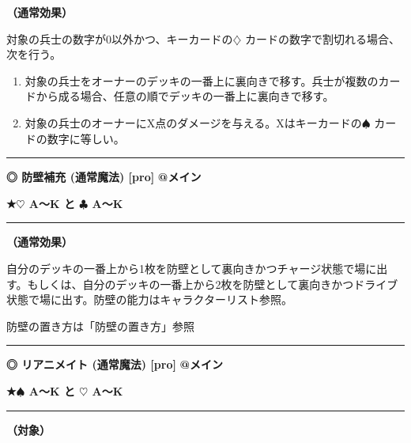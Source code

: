 \documentclass[twocolumn,a5paper,papersize,10pt]{jarticle}
\begin{document}
{\bf（通常効果）}

対象の兵士の数字が0以外かつ、キーカードの{\normalsize $\diamondsuit$} カードの数字で割切れる場合、次を行う。


\vspace{-1zh}%
\begin{enumerate}
\setlength{\leftskip}{-0.3cm}
\setlength{\parskip}{0pt} %

\item 対象の兵士をオーナーのデッキの一番上に裏向きで移す。兵士が複数のカードから成る場合、任意の順でデッキの一番上に裏向きで移す。

\item 対象の兵士のオーナーにX点のダメージを与える。Xはキーカードの{\normalsize $\spadesuit$} カードの数字に等しい。
\vspace{-1zh}%
\end{enumerate}
\vspace{2mm} %
\hrule height 0.5mm depth 0mm width 66.5mm %
\vspace{1mm} %
{\small\bf ◎ 防壁補充 {\scriptsize (通常魔法) [pro]}} %
\hfill 
{\footnotesize\bf @メイン }

{\footnotesize\bf ★{\normalsize $\heartsuit$} A〜K と {\normalsize $\clubsuit$} A〜K}

\vspace{1mm}%
\hrule height 0.1mm depth 0mm width 66.5mm %
\vspace{1mm}%

{\bf（通常効果）}

自分のデッキの一番上から1枚を防壁として裏向きかつチャージ状態で場に出す。もしくは、自分のデッキの一番上から2枚を防壁として裏向きかつドライブ状態で場に出す。防壁の能力はキャラクターリスト参照。

防壁の置き方は「防壁の置き方」参照
\vspace{2mm} %
\hrule height 0.5mm depth 0mm width 66.5mm %
\vspace{1mm} %
{\small\bf ◎ リアニメイト {\scriptsize (通常魔法) [pro]}} %
\hfill 
{\footnotesize\bf @メイン }

{\footnotesize\bf ★{\normalsize $\spadesuit$} A〜K と {\normalsize $\heartsuit$} A〜K}

\vspace{1mm}%
\hrule height 0.1mm depth 0mm width 66.5mm %
\vspace{1mm}%
{\bf（対象）}
\end{document}
